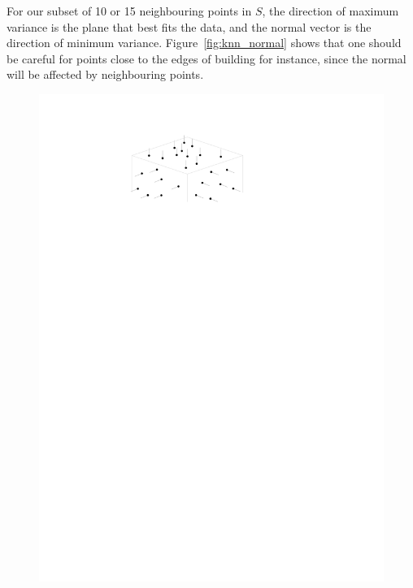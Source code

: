 For our subset of 10 or 15 neighbouring points in $S$, the direction of maximum variance is the plane that best fits the data, and the normal vector is the direction of minimum variance.
Figure~\ref{fig:knn_normal} shows that one should be careful for points close to the edges of building for instance, since the normal will be affected by neighbouring points.
\begin{marginfigure}
  \centering
  \begin{subfigure}[b]{\linewidth}
    \centering
    \includegraphics[width=\textwidth,page=1]{normal.pdf}
    \caption{}\label{fig:normal:a}
  \end{subfigure}
  \qquad
  \begin{subfigure}[b]{\linewidth}
    \centering

\end{subfigure}
\end{marginfigure}
